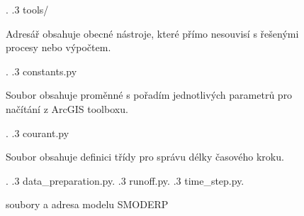 \documentclass[border=5pt]{standalone}
\begin{document}
\begin{figure}[th!]
{{\begin{minipage}[t]{0.4\textwidth}
                             \end{minipage}.
.3 tools/    \dotfill \begin{minipage}[t]{0.4\textwidth}
		Adresář obsahuje obecné nástroje, které přímo nesouvisí s řešenými procesy nebo výpočtem{.}
		\end{minipage}.
.3 constants.py    \dotfill \begin{minipage}[t]{0.4\textwidth}
		    Soubor obsahuje proměnné s pořadím jednotlivých parametrů pro načítání z ArcGIS toolboxu{.}
		    \end{minipage}.
.3 courant.py    \dotfill \begin{minipage}[t]{0.4\textwidth}
		    Soubor obsahuje definici třídy pro správu délky časového kroku{.}
		    \end{minipage}.
.3 data\_preparation.py.%
.3 runoff.py.
.3 time\_step.py.
}
}
\caption{soubory a adresa modelu SMODERP}
\label{fig:adresare}
\end{figure}
\end{document}
